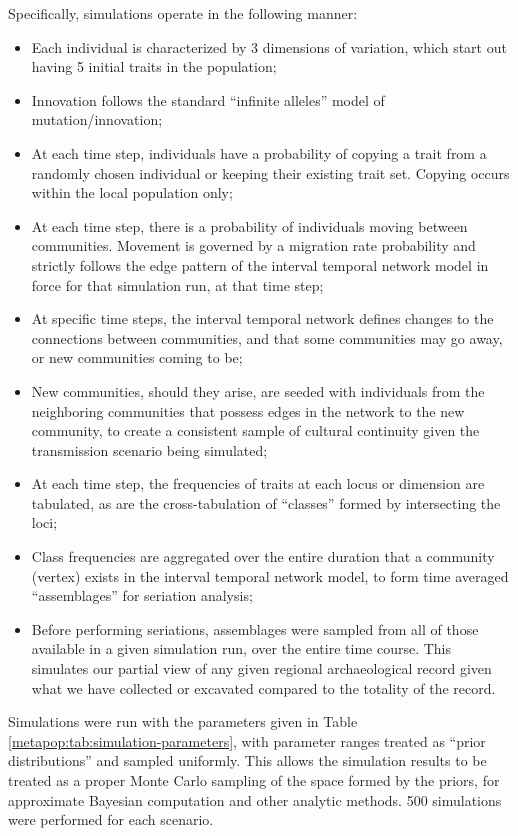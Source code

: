     Specifically, simulations operate in the following manner:
    
    \begin{itemize}
        \item Each individual is characterized by 3 dimensions of variation, which start out having 5 initial traits in the population;
        \item Innovation follows the standard ``infinite alleles'' model of mutation/innovation;
        \item At each time step, individuals have a probability of copying a trait from a randomly chosen individual or keeping their existing trait set.  Copying occurs within the local population only;
        \item At each time step, there is a probability of individuals moving between communities.  Movement is governed by a migration rate probability and strictly follows the edge pattern of the interval temporal network model in force for that simulation run, at that time step;
        \item At specific time steps, the interval temporal network defines changes to the connections between communities, and that some communities may go away, or new communities coming to be;
        \item New communities, should they arise, are seeded with individuals from the neighboring communities that possess edges in the network to the new community, to create a consistent sample of cultural continuity given the transmission scenario being simulated;
        \item At each time step, the frequencies of traits at each locus or dimension are tabulated, as are the cross-tabulation of ``classes'' formed by intersecting the loci;
        \item Class frequencies are aggregated over the entire duration that a community (vertex) exists in the interval temporal network model, to form time averaged ``assemblages'' for seriation analysis;
        \item Before performing seriations, assemblages were sampled from all of those available in a given simulation run, over the entire time course.  This simulates our partial view of any given regional archaeological record given what we have collected or excavated compared to the totality of the record.
    \end{itemize}
    
    Simulations were run with the parameters given in Table \ref{metapop:tab:simulation-parameters}, with parameter ranges treated as ``prior distributions'' and sampled uniformly.  This allows the simulation results to be treated as a proper Monte Carlo sampling of the space formed by the priors, for approximate Bayesian computation and other analytic methods.  500 simulations were performed for each scenario.
    
